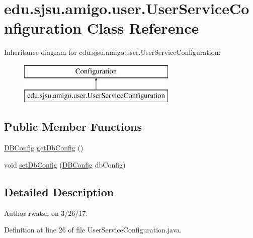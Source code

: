 \hypertarget{classedu_1_1sjsu_1_1amigo_1_1user_1_1_user_service_configuration}{}\section{edu.\+sjsu.\+amigo.\+user.\+User\+Service\+Configuration Class Reference}
\label{classedu_1_1sjsu_1_1amigo_1_1user_1_1_user_service_configuration}
Inheritance diagram for edu.\+sjsu.\+amigo.\+user.\+User\+Service\+Configuration\+:\begin{figure}[H]
\begin{center}
\leavevmode
\includegraphics[height=2.000000cm]{classedu_1_1sjsu_1_1amigo_1_1user_1_1_user_service_configuration}
\end{center}
\end{figure}
\subsection*{Public Member Functions}
\begin{DoxyCompactItemize}
\item 
\hyperlink{classedu_1_1sjsu_1_1amigo_1_1user_1_1_d_b_config}{D\+B\+Config} \hyperlink{classedu_1_1sjsu_1_1amigo_1_1user_1_1_user_service_configuration_afb210dd7f90476733962c70c558ecba1}{get\+Db\+Config} ()
\item 
void \hyperlink{classedu_1_1sjsu_1_1amigo_1_1user_1_1_user_service_configuration_aff67b8696176b111418ebd1cfa6d2b83}{set\+Db\+Config} (\hyperlink{classedu_1_1sjsu_1_1amigo_1_1user_1_1_d_b_config}{D\+B\+Config} db\+Config)
\end{DoxyCompactItemize}


\subsection{Detailed Description}
\begin{DoxyAuthor}{Author}
rwatsh on 3/26/17. 
\end{DoxyAuthor}


Definition at line 26 of file User\+Service\+Configuration.\+java.



